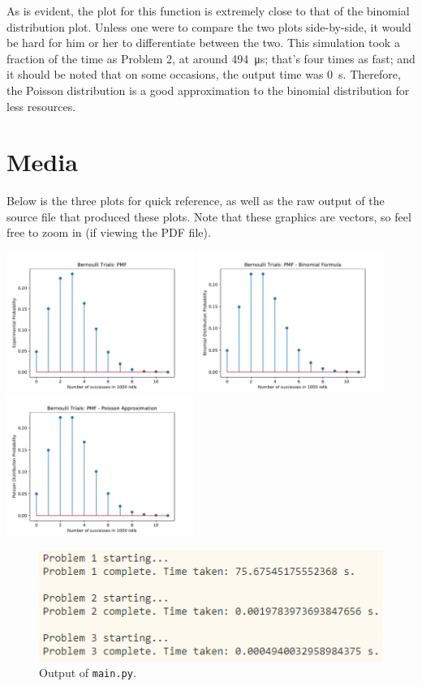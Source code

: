 \documentclass{article}
\renewcommand{\c}[1]{\texttt{#1}}
\begin{document}
As is evident, the plot for this function is extremely
close to that of the binomial distribution plot. Unless one
were to compare the two plots side-by-side, it would be hard
for him or her to differentiate between the two. This
simulation took a fraction of the time as Problem 2,
at around \SI{494}{\micro\second}; that's four times as fast;
and it should be noted that on some occasions, the output
time was \SI{0}{s}. Therefore, the Poisson distribution
is a good approximation to the binomial distribution
for less resources.

\pagebreak

\section{Media} Below is the three plots for quick reference,
as well as the raw output of the source file that produced these
plots. Note that these graphics are vectors, so feel free
to zoom in (if viewing the PDF file).

\noindent
\includegraphics[width=172.5pt]{Images/Figure_1}
\includegraphics[width=172.5pt]{Images/Figure_2}
\includegraphics[width=172.5pt]{Images/Figure_3}

\begin{figure}[H]
    \centering
    \includegraphics{Images/output}
    \caption{Output of \c{main.py}.}
    \label{output}
\end{figure}
\end{document}
